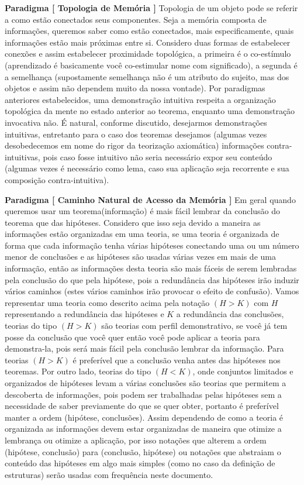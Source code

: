 \documentclass[10pt,a4paper]{report}
\begin{document}
\textbf{Paradigma [ Topologia de Memória ]} Topologia de um objeto pode se referir a como estão conectados seus componentes. Seja a memória composta de informações, queremos saber como estão conectados, mais especificamente, quais informações estão mais próximas entre si. Considero duas formas de estabelecer conexões e assim estabelecer proximidade topológica, a primeira é o co-estímulo (aprendizado é basicamente você co-estimular nome com significado), a segunda é a semelhança (supostamente semelhança não é um atributo do sujeito, mas dos objetos e assim não dependem muito da nossa vontade). Por paradigmas anteriores estabelecidos, uma demonstração intuitiva respeita a organização topológica da mente no estado anterior ao teorema, enquanto uma demonstração invocativa não. É natural, conforme discutido, desejarmos demonstrações intuitivas, entretanto para o caso dos teoremas desejamos (algumas vezes desobedecemos em nome do rigor da teorização axiomática) informações contra-intuitivas, pois caso fosse intuitivo não seria necessário expor seu conteúdo (algumas vezes é necessário como lema, caso sua aplicação seja recorrente e sua composição contra-intuitiva).

\hspace{\baselineskip}

\textbf{Paradigma [ Caminho Natural de Acesso da Memória ]} Em geral quando queremos usar um teorema(informação) é mais fácil lembrar da conclusão do teorema que das hipóteses. Considero que isso seja devido a maneira as informações estão organizadas em uma teoria, se uma teoria é organizada de forma que cada informação tenha várias hipóteses conectando uma ou um número menor de conclusões e as hipóteses são usadas várias vezes em mais de uma informação, então as informações desta teoria são mais fáceis de serem lembradas pela conclusão do que pela hipótese, pois a redundância das hipóteses irão induzir vários caminhos (estes vários caminhos irão provocar o efeito de confusão). Vamos representar uma teoria como descrito acima pela notação $(H>K)$ com $H$ representando a redundância das hipóteses e $K$ a redundância das conclusões, teorias do tipo $(H>K)$ são teorias com perfil demonstrativo, se você já tem posse da conclusão que você quer então você pode aplicar a teoria para demonstra-la, pois será mais fácil pela conclusão lembrar da informação. Para teorias $(H>K)$ é preferível que a conclusão venha antes das hipóteses nos teoremas. Por outro lado, teorias do tipo $(H<K)$, onde conjuntos limitados e organizados de hipóteses levam a várias conclusões são teorias que permitem a descoberta de informações, pois podem ser trabalhadas pelas hipóteses sem a necessidade de saber previamente do que se quer obter, portanto é preferível manter a ordem (hipótese, conclusões). Assim dependendo de como a teoria é organizada as informações devem estar organizadas de maneira que otimize a lembrança ou otimize a aplicação, por isso notações que alterem a ordem (hipótese, conclusão) para (conclusão, hipótese) ou notações que abstraiam o conteúdo das hipóteses em algo mais simples (como no caso da definição de estruturas) serão usadas com frequência neste documento.
\end{document}
